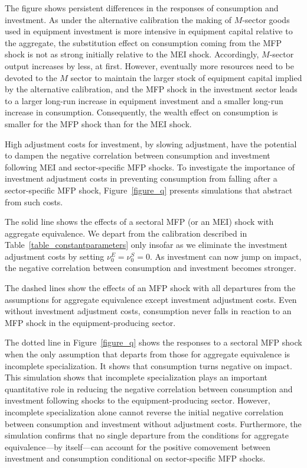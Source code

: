 \documentclass[12pt,fleqn]{article}
\begin{document}
{\normalsize The figure shows persistent differences in the
responses of consumption and investment. As under the alternative
calibration the making of $M$-sector goods used in equipment
investment is more intensive in equipment capital relative to the
aggregate, the substitution effect on consumption coming from the
MFP shock is not as strong initially relative to the MEI shock.
Accordingly, $M$-sector output increases by less, at first. However,
eventually more resources need to be devoted to the $M$ sector to
maintain the larger stock of equipment capital implied by the
alternative calibration, and the MFP shock in the investment sector
leads to a larger long-run increase in equipment investment and a
smaller long-run increase in consumption. Consequently, the wealth
effect on consumption is smaller for the MFP shock than for the MEI
shock.

High adjustment costs for investment, by slowing adjustment,
have the potential to dampen the negative correlation between consumption
and investment following MEI and sector-specific MFP shocks. To investigate
the importance of investment adjustment costs in preventing consumption from
falling after a sector-specific MFP shock, Figure~\ref{figure_q} presents
simulations that abstract from such costs.

{\normalsize The solid line shows the effects of a sectoral MFP (or an MEI)
shock with aggregate equivalence. We depart from the calibration described
in Table~\ref{table_constantparameters} only insofar as we eliminate the
investment adjustment costs by setting $\nu^E_0=\nu^S_0=0$. As investment
can now jump on impact, the negative correlation between consumption and
investment becomes stronger. }

{\normalsize The dashed lines show the effects of an MFP shock with all
departures from the assumptions for aggregate equivalence except investment
adjustment costs. Even without investment adjustment costs, consumption
never falls in reaction to an MFP shock in the equipment-producing sector. }

{\normalsize The dotted line in Figure~\ref{figure_q} shows the responses to
a sectoral MFP shock when the only assumption that departs from those for
aggregate equivalence is incomplete specialization. It shows that
consumption turns negative on impact. This simulation shows that incomplete
specialization plays an important quantitative role in reducing the negative
correlation between consumption and investment following shocks to the
equipment-producing sector. However, incomplete specialization alone cannot
reverse the initial negative correlation between consumption and investment
without adjustment costs. Furthermore, the simulation confirms that no
single departure from the conditions for aggregate equivalence---by
itself---can account for the positive comovement between investment and
consumption conditional on sector-specific MFP shocks. }


}
\end{document}
